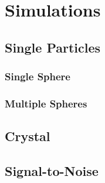 \chapter{Simulations}
\label{chap:simulation}
\section{Single Particles}
\subsection{Single Sphere}
\subsection{Multiple Spheres}
\section{Crystal}
\section{Signal-to-Noise}

